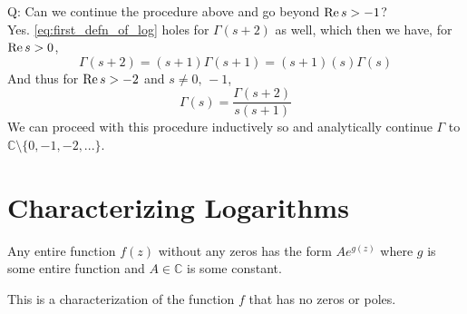 \documentclass[11pt, oneside]{book}
\begin{document}
Q: Can we continue the procedure above and go beyond $\operatorname{Re}{s} > -1$? \\
Yes. \cref{eq:first_defn_of_log} holes for $\Gamma(s + 2)$ as well, which then
we have, for $\operatorname{Re}{s} > 0$,
\begin{equation*}
  \Gamma(s + 2) = (s + 1) \Gamma(s + 1) = (s + 1) (s) \Gamma(s)
\end{equation*}
And thus for $\operatorname{Re}{s} > -2$ and $s \neq 0, \, -1$,
\begin{equation*}
  \Gamma(s) = \frac{\Gamma(s + 2)}{s (s + 1)}
\end{equation*}
We can proceed with this procedure inductively so and analytically continue $\Gamma$ to $\mathbb{C} \setminus \{0, -1, -2, ...\}$.


\section{Characterizing Logarithms} %
\label{sec:characterizing_logarithms}

\begin{thm*}[Theorem 18]\label{thm:theorem_18}
  Any entire function $f(z)$ without any zeros has the form $Ae^{g(z)}$ where $g$ is some entire function and $A \in \mathbb{C}$ is some constant.
\end{thm*}

This is a characterization of the function $f$ that has no zeros or poles.



\printindex
\end{document}
